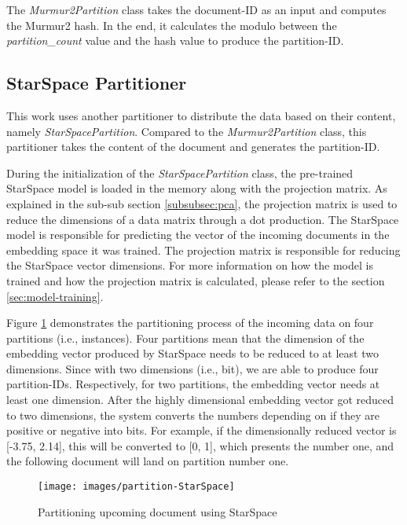The \emph{Murmur2Partition} class takes the document-ID as an input and computes the Murmur2 hash. In the end, it calculates the modulo between the \emph{partition\_count} value and the hash value to produce the partition-ID. 

\subsection{StarSpace Partitioner}
\label{subsec:partitioning-star-space}
This work uses another partitioner to distribute the data based on their content, namely \emph{StarSpacePartition}. Compared to the \emph{Murmur2Partition} class, this partitioner takes the content of the document and generates the partition-ID.


During the initialization of the  \emph{StarSpacePartition} class, the pre-trained StarSpace model is loaded in the memory along with the projection matrix. As explained in the sub-sub section \ref{subsubsec:pca}, the projection matrix is used to reduce the dimensions of a data matrix through a dot production. The StarSpace model is responsible for predicting the vector of the incoming documents in the embedding space it was trained. The projection matrix is responsible for reducing the StarSpace vector dimensions. For more information on how the model is trained and how the projection matrix is calculated, please refer to the section \ref{sec:model-training}.


Figure \ref{fig:star-space-partitioning-process} demonstrates the partitioning process of the incoming data on four partitions (i.e., instances). Four partitions mean that the dimension of the embedding vector produced by StarSpace needs to be reduced to at least two dimensions. Since with two dimensions (i.e., bit), we are able to produce four partition-IDs. Respectively, for two partitions, the embedding vector needs at least one dimension. After the highly dimensional embedding vector got reduced to two dimensions, the system converts the numbers depending on if they are positive or negative into bits. For example, if the dimensionally reduced vector is [-3.75, 2.14], this will be converted to [0, 1], which presents the number one, and the following document will land on partition number one.


\begin{figure}[!h]
    \centering
    \texttt{[image: images/partition-StarSpace]}
    \caption{Partitioning upcoming document using StarSpace}
    \label{fig:star-space-partitioning-process}
\end{figure}


